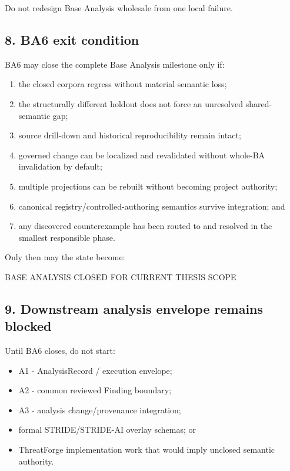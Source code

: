 \documentclass[
  10pt,
  a4paper,
]{article}
\newenvironment{Shaded}{}{}
\newcommand{\NormalTok}[1]{#1}
\providecommand{\tightlist}{%
  \setlength{\itemsep}{0pt}\setlength{\parskip}{0pt}}
\begin{document}
Do not redesign Base Analysis wholesale from one local failure.

\subsection{8. BA6 exit condition}\label{8-ba6-exit-condition}

BA6 may close the complete Base Analysis milestone only if:

\begin{enumerate}
\def\labelenumi{\arabic{enumi}.}
\tightlist
\item
  the closed corpora regress without material semantic loss;
\item
  the structurally different holdout does not force an unresolved
  shared-semantic gap;
\item
  source drill-down and historical reproducibility remain intact;
\item
  governed change can be localized and revalidated without whole-BA
  invalidation by default;
\item
  multiple projections can be rebuilt without becoming project
  authority;
\item
  canonical registry/controlled-authoring semantics survive integration;
  and
\item
  any discovered counterexample has been routed to and resolved in the
  smallest responsible phase.
\end{enumerate}

Only then may the state become:

\begin{Shaded}
\begin{Highlighting}[]
\NormalTok{BASE ANALYSIS    CLOSED FOR CURRENT THESIS SCOPE}
\end{Highlighting}
\end{Shaded}

\subsection{9. Downstream analysis envelope remains
blocked}\label{9-downstream-analysis-envelope-remains-blocked}

Until BA6 closes, do not start:

\begin{itemize}
\tightlist
\item
  A1 - AnalysisRecord / execution envelope;
\item
  A2 - common reviewed Finding boundary;
\item
  A3 - analysis change/provenance integration;
\item
  formal STRIDE/STRIDE-AI overlay schemas; or
\item
  ThreatForge implementation work that would imply unclosed semantic
  authority.
\end{itemize}
\end{document}

